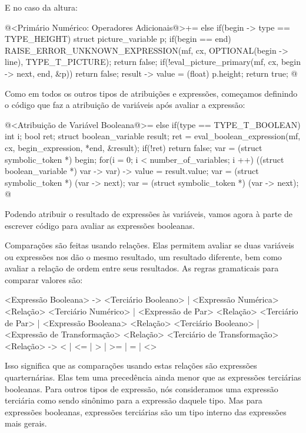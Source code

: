 {{{{{{E no caso da altura:

\iniciocodigo
@<Primário Numérico: Operadores Adicionais@>+=
else if(begin -> type == TYPE_HEIGHT){
  struct picture_variable p;
  if(begin == end){
    RAISE_ERROR_UNKNOWN_EXPRESSION(mf, cx, OPTIONAL(begin -> line),
                                   TYPE_T_PICTURE);
    return false;
  }
  if(!eval_picture_primary(mf, cx, begin -> next, end, &p))
    return false;
  result -> value = (float) p.height;
  return true;
}
@
\fimcodigo



Como em todos os outros tipos de atribuições e expressões, começamos
definindo o código que faz a atribuição de variáveis após avaliar a
expressão:

\iniciocodigo
@<Atribuição de Variável Booleana@>=
else if(type == TYPE_T_BOOLEAN){
  int i;
  bool ret;
  struct boolean_variable result;
  ret = eval_boolean_expression(mf, cx, begin_expression, *end, &result);
  if(!ret)
    return false;
  var = (struct symbolic_token *) begin;
  for(i = 0; i < number_of_variables; i ++){
    ((struct boolean_variable *) var -> var) -> value = result.value;
    var = (struct symbolic_token *) (var -> next);
    var = (struct symbolic_token *) (var -> next);
  }
}
@
\fimcodigo

Podendo atribuir o resultado de expressões às variáveis, vamos agora à
parte de escrever código para avaliar as expressões booleanas.


Comparações são feitas usando relações. Elas permitem avaliar se duas
variáveis ou expressões nos dão o mesmo resultado, um resultado
diferente, bem como avaliar a relação de ordem entre seus
resultados. As regras gramaticais para comparar valores são:

\alinhaverbatim
<Expressão Booleana> -> <Terciário Booleano> |
                        <Expressão Numérica> <Relação> <Terciário Numérico> |
                        <Expressão de Par> <Relação> <Terciário de Par>     |
                        <Expressão Booleana> <Relação> <Terciário Booleano> |
                        <Expressão de Transformação> <Relação>
                                           <Terciário de Transformação>
<Relação> -> < | <= | > | >= | = | <>
\alinhanormal

Isso significa que as comparações usando estas relações são expressões
quarternárias. Elas tem uma precedência ainda menor que as expressões
terciárias booleanas. Para outros tipos de expressão, nós consideramos
uma expressão terciária como sendo sinônimo para a expressão daquele
tipo. Mas para expressões booleanas, expressões terciárias são um tipo
interno das expressões mais gerais.

}}}}}}
